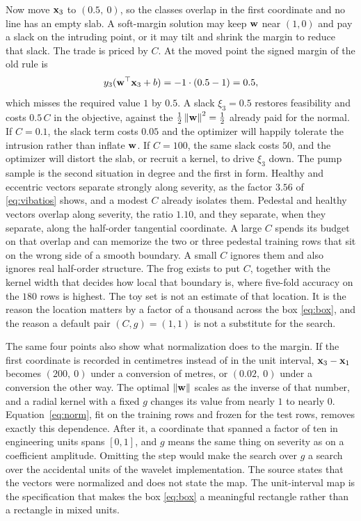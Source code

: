 Now move \(\mathbf{x}_{3}\) to \((0.5,\ 0)\), so the classes overlap in the first coordinate and no line has an empty slab.
A soft-margin solution may keep \(\mathbf{w}\) near \((1,0)\) and pay a slack on the intruding point, or it may tilt and shrink the margin to reduce that slack.
The trade is priced by \(C\).
At the moved point the signed margin of the old rule is
\begin{equation}
y_{3}(\mathbf{w}^{\top}\mathbf{x}_{3}+b)
= -1\cdot(0.5-1)=0.5,
\label{eq:slackex}
\end{equation}
which misses the required value \(1\) by \(0.5\).
A slack \(\xi_{3}=0.5\) restores feasibility and costs \(0.5\,C\) in the objective, against the \(\tfrac12\left\lVert \mathbf{w} \right\rVert^{2}=\tfrac12\) already paid for the normal.
If \(C=0.1\), the slack term costs \(0.05\) and the optimizer will happily tolerate the intrusion rather than inflate \(\mathbf{w}\).
If \(C=100\), the same slack costs \(50\), and the optimizer will distort the slab, or recruit a kernel, to drive \(\xi_{3}\) down.
The pump sample is the second situation in degree and the first in form.
Healthy and eccentric vectors separate strongly along severity, as the factor \(3.56\) of \eqref{eq:vibatios} shows, and a modest \(C\) already isolates them.
Pedestal and healthy vectors overlap along severity, the ratio \(1.10\), and they separate, when they separate, along the half-order tangential coordinate.
A large \(C\) spends its budget on that overlap and can memorize the two or three pedestal training rows that sit on the wrong side of a smooth boundary.
A small \(C\) ignores them and also ignores real half-order structure.
The frog exists to put \(C\), together with the kernel width that decides how local that boundary is, where five-fold accuracy on the \(180\) rows is highest.
The toy set is not an estimate of that location.
It is the reason the location matters by a factor of a thousand across the box \eqref{eq:box}, and the reason a default pair \((C, g)=(1, 1)\) is not a substitute for the search.

The same four points also show what normalization does to the margin.
If the first coordinate is recorded in centimetres instead of in the unit interval, \(\mathbf{x}_{3}-\mathbf{x}_{1}\) becomes \((200,\ 0)\) under a conversion of metres, or \((0.02,\ 0)\) under a conversion the other way.
The optimal \(\left\lVert \mathbf{w} \right\rVert\) scales as the inverse of that number, and a radial kernel with a fixed \(g\) changes its value from nearly \(1\) to nearly \(0\).
Equation~\eqref{eq:norm}, fit on the training rows and frozen for the test rows, removes exactly this dependence.
After it, a coordinate that spanned a factor of ten in engineering units spans \([0,1]\), and \(g\) means the same thing on severity as on a coefficient amplitude.
Omitting the step would make the search over \(g\) a search over the accidental units of the wavelet implementation.
The source states that the vectors were normalized and does not state the map.
The unit-interval map is the specification that makes the box \eqref{eq:box} a meaningful rectangle rather than a rectangle in mixed units.

